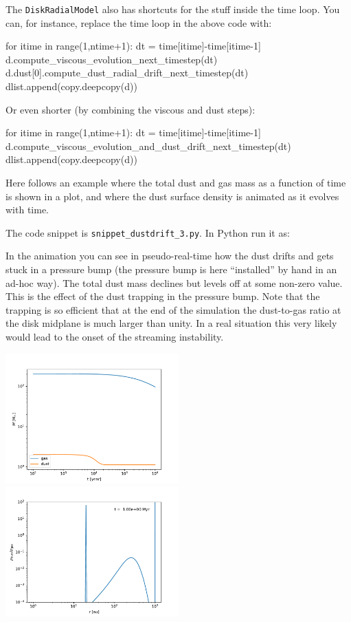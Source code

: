 \documentclass{book}
\newcommand{\code}[1]{{\small\tt #1}}
\begin{document}
The \code{DiskRadialModel} also has shortcuts for the stuff inside the time
loop. You can, for instance, replace the time loop in the above code
with:
\begin{codebox}
for itime in range(1,ntime+1):
   dt = time[itime]-time[itime-1]
   d.compute_viscous_evolution_next_timestep(dt)
   d.dust[0].compute_dust_radial_drift_next_timestep(dt)
   dlist.append(copy.deepcopy(d))
\end{codebox}
Or even shorter (by combining the viscous and dust steps):
\begin{codebox}
for itime in range(1,ntime+1):
   dt = time[itime]-time[itime-1]
   d.compute_viscous_evolution_and_dust_drift_next_timestep(dt)
   dlist.append(copy.deepcopy(d))
\end{codebox}

Here follows an example where the total dust and gas mass as a function of time
is shown in a plot, and where the dust surface density is animated
as it evolves with time.

The code snippet is
\code{snippet\_dustdrift\_3.py}. In Python run it as:
\begin{codebox}
\end{codebox}

In the animation you can see in pseudo-real-time how the dust drifts and gets
stuck in a pressure bump (the pressure bump is here ``installed'' by hand in an
ad-hoc way). The total dust mass declines but levels off at some non-zero
value. This is the effect of the dust trapping in the pressure bump. Note that
the trapping is so efficient that at the end of the simulation the dust-to-gas
ratio at the disk midplane is much larger than unity. In a real situation
this very likely would lead to the onset of the streaming instability.

\centerline{\includegraphics[width=0.5\textwidth]{../snippets/fig_snippet_dustdrift_3_1.pdf}
\includegraphics[width=0.5\textwidth]{../snippets/fig_snippet_dustdrift_3_2.pdf}}
\end{document}
